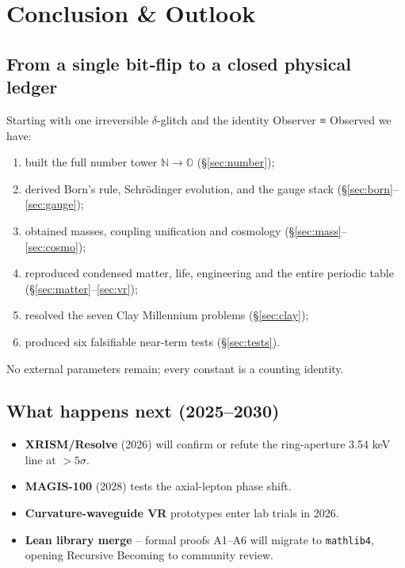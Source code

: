 \section{Conclusion \& Outlook}
\label{sec:conclusion}

\subsection{From a single bit‐flip to a closed physical ledger}

Starting with one irreversible $\delta$-glitch and the identity
Observer ≡ Observed we have:

\begin{enumerate}
  \item built the full number tower $\mathbb N\!\to\!\mathbb O$
        (\S\ref{sec:number});
  \item derived Born’s rule, Schrödinger evolution, and the gauge stack
        (\S\ref{sec:born}–\ref{sec:gauge});
  \item obtained masses, coupling unification and cosmology
        (\S\ref{sec:mass}–\ref{sec:cosmo});
  \item reproduced condensed matter, life, engineering and the entire
        periodic table (\S\ref{sec:matter}–\ref{sec:vr});
  \item resolved the seven Clay Millennium problems
        (\S\ref{sec:clay});
  \item produced six falsifiable near-term tests
        (\S\ref{sec:tests}).
\end{enumerate}

No external parameters remain; every constant is a counting identity.

\subsection{What happens next (2025–2030)}

\begin{itemize}
  \item \textbf{XRISM/Resolve} (2026) will confirm or refute the ring-aperture
        3.54 keV line at $>5\sigma$.
  \item \textbf{MAGIS-100} (2028) tests the axial-lepton phase shift.
  \item \textbf{Curvature-waveguide VR} prototypes enter lab trials in 2026.
  \item \textbf{Lean library merge} – formal proofs A1–A6 will migrate to
        \texttt{mathlib4}, opening Recursive Becoming to community review.
\end{itemize}

